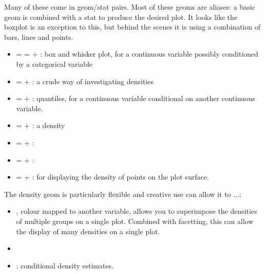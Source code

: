 % 



Many of these come in geom/stat pairs.  Most of these geoms are aliases: a basic geom is combined with a stat to produce the desired plot.  It looks like the boxplot is an exception to this, but behind the scenes it is using a combination of bars, lines and points.

\begin{itemize}
	\item {} = =  + : box and whisker plot, for a continuous variable possibly conditioned by a categorical variable
	\item {} =  + : a crude way of investigating densities
	\item {} =  + : quantiles, for a continuous variable conditional on another continuous variable.
	\item {} =  + : a density
	\item {} =  + : 
	\item {} =  + :
	\item {} =  + : for displaying the density of points on the plot surface.
\end{itemize}

The density geom is particularly flexible and creative use can allow it to ...: 

\begin{itemize}
  \item {}, colour mapped to another variable, allows you to superimpose the densities of multiple groups on a single plot.  Combined with facetting, this can allow the display of many densities on a single plot.
  
  \item {}

  \item {}: conditional density estimates.
\end{itemize}

